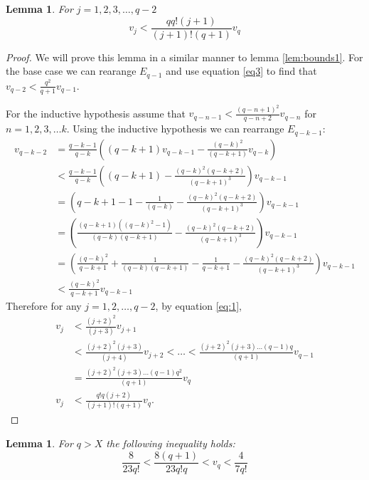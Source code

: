 \documentclass[12pt]{article} %
\newtheorem{lem}[thm]{Lemma}
\theoremstyle{definition}
\begin{document}
\begin{lem}\label{lem:bounds2}
  For $j = 1,2,3,\dots,q-2$ 
  \[v_{j} < \frac{qq!(j+1)}{(j+1)!(q+1)}v_{q}\]
 \end{lem}
\begin{proof}
We will prove this lemma in a similar manner to lemma \ref{lem:bounds1}.  For the base case we can rearange $E_{q-1}$ and use equation \ref{eq3} to find that $v_{q-2} < \frac{q^{2}}{q+1}v_{q-1}$.
 
For the inductive hypothesis assume that $ v_{q-n-1} < \frac{(q-n+1)^{2}}{q-n+2}v_{q-n}$ for $n = 1,2,3,\dots k$.  Using the inductive hypothesis we can rearrange $E_{q-k-1}$:
\begin{align}\label{eq:1}
  v_{q-k-2} &= \frac{q-k-1}{q-k}\left((q-k+1)v_{q-k-1} - \frac{(q-k)^{2}}{(q-k+1)}v_{q-k} \right) \\
  &< \frac{q-k-1}{q-k}\left((q-k+1)- \frac{(q-k)^{2}(q-k+2)}{(q-k+1)^{3}} \right)v_{q-k-1} \\
  &= \left(q- k + 1 -1 -\frac{1}{(q-k)} - \frac{(q-k)^{2}(q-k+2)}{(q-k+1)^{3}} \right)v_{q-k-1} \\
  &= \left( \frac{(q-k+1)((q-k)^{2}-1)}{(q-k)(q-k+1)} - \frac{(q-k)^{2}(q-k+2)}{(q-k+1)^{3}} \right)v_{q-k-1} \\
  &= \left( \frac{(q-k)^{2}}{q-k+1} + \frac{1}{(q-k)(q-k+1)} - \frac{1}{q-k+1} - \frac{(q-k)^{2}(q-k+2)}{(q-k+1)^{3}} \right)v_{q-k-1} \\
  &< \frac{(q-k)^{2}}{q-k+1}v_{q-k-1}
\end{align}
 Therefore for any $j = 1,2,\dots,q-2$, by equation \ref{eq:1},
 \begin{align}
  v_{j} &< \frac{(j+2)^{2}}{(j+3)}v_{j+1} \\
  &< \frac{(j+2)^{2}(j+3)}{(j+4)}v_{j+2} < \dots < \frac{(j+2)^{2}(j+3)\dots(q-1)q}{(q+1)}v_{q-1} \\
  &= \frac{(j+2)^{2}(j+3)\dots(q-1)q^{2}}{(q+1)}v_{q} \\
  v_{j} &< \frac{q!q(j+2)}{(j+1)!(q+1)}v_{q}.
 \end{align}
 \end{proof}

\begin{lem}\label{lem:bounds3}
 For $q > X$ the following inequality holds:
 \[\frac{8}{23q!}< \frac{8(q+1)}{23q!q} < v_{q} < \frac{4}{7q!}\]
 \end{lem}
 
\end{document}
